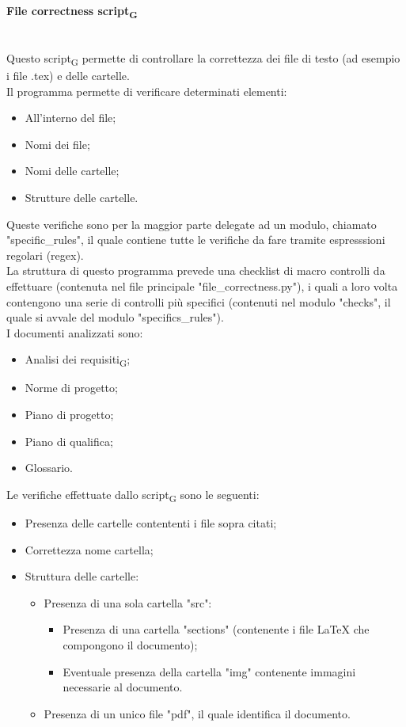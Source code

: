 \paragraph{File correctness script\textsubscript{G}}\mbox{}\\
Questo script\textsubscript{G} permette di controllare la correttezza dei file di testo (ad esempio i file .tex) e delle cartelle.\\
Il programma permette di verificare determinati elementi:
\begin{itemize}
	\item All'interno del file;
	\item Nomi dei file;
	\item Nomi delle cartelle;
	\item Strutture delle cartelle.
\end{itemize}
\noindent Queste verifiche sono per la maggior parte delegate ad un modulo, chiamato "specific\_rules", il quale contiene tutte le verifiche da fare tramite espresssioni regolari (regex). \\
La struttura di questo programma prevede una checklist di macro controlli da effettuare (contenuta nel file principale "file\_correctness.py"), i quali a loro volta contengono una serie di controlli più specifici (contenuti nel modulo "checks", il quale si avvale del modulo "specifics\_rules"). \\
I documenti analizzati sono:
\begin{itemize}
	\item Analisi dei requisiti\textsubscript{G};
	\item Norme di progetto;
	\item Piano di progetto;
	\item Piano di qualifica;
	\item Glossario.
\end{itemize}
\noindent Le verifiche effettuate dallo script\textsubscript{G} sono le seguenti:
\begin{itemize}
	\item Presenza delle cartelle contententi i file sopra citati;
	\item Correttezza nome cartella;
	\item Struttura delle cartelle:
		\begin{itemize}
			\item Presenza di una sola cartella "src":
				\begin{itemize}
					\item Presenza di una cartella "sections" (contenente i file LaTeX che compongono il documento);
					\item Eventuale presenza della cartella "img" contenente immagini necessarie al documento.
				\end{itemize}
			\item Presenza di un unico file "pdf", il quale identifica il documento.
		\end{itemize}
\end{itemize}
